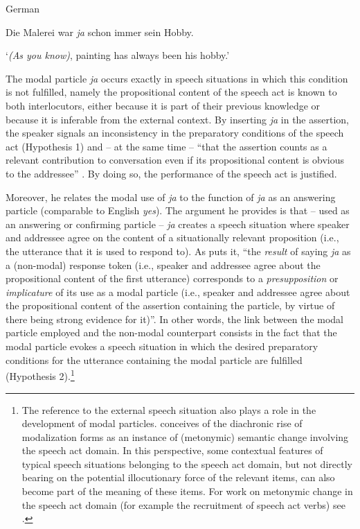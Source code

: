           German \citep[1398]{Waltereit2001}

Die Malerei war \textit{ja} schon immer sein Hobby.

\glt ‘\textit{(As you know)}, painting has always been his hobby.’
    \z %

The modal particle \textit{ja} occurs exactly in speech situations in which this condition is not fulfilled, namely the propositional content of the speech act is known to both interlocutors, either because it is part of their previous knowledge or because it is inferable from the external context. By inserting \textit{ja} in the assertion, the speaker signals an inconsistency in the preparatory conditions of the speech act (Hypothesis 1) and – at the same time – “that the assertion counts as a relevant contribution to conversation even if its propositional content is obvious to the addressee” \citep[1398]{Waltereit2001}. By doing so, the performance of the speech act is justified.

Moreover, he relates the modal use of \textit{ja} to the function of \textit{ja} as an answering particle (comparable to English \textit{yes}). The argument he provides is that – used as an answering or confirming particle – \textit{ja} creates a speech situation where speaker and addressee agree on the content of a situationally relevant proposition (i.e., the utterance that it is used to respond to). As \citet[1399]{Waltereit2001} puts it, “the \textit{result} of saying \textit{ja} as a (non-modal) response token (i.e., speaker and addressee agree about the propositional content of the first utterance) corresponds to a \textit{presupposition} or \textit{implicature} of its use as a modal particle (i.e., speaker and addressee agree about the propositional content of the assertion containing the particle, by virtue of there being strong evidence for it)”. In other words, the link between the modal particle employed and the non-modal counterpart consists in the fact that the modal particle evokes a speech situation in which the desired preparatory conditions for the utterance containing the modal particle are fulfilled (Hypothesis 2).\footnote{The reference to the external speech situation also plays a role in the development of modal particles. \citet[1410--1414]{Waltereit2001} conceives of the diachronic rise of modalization forms as an instance of (metonymic) semantic change involving the speech act domain. In this perspective, some contextual features of typical speech situations belonging to the speech act domain, but not directly bearing on the potential illocutionary force of the relevant items, can also become part of the meaning of these items. For work on metonymic change in the speech act domain (for example the recruitment of speech act verbs) see \citet{Koch1999,Koch2001}.}

